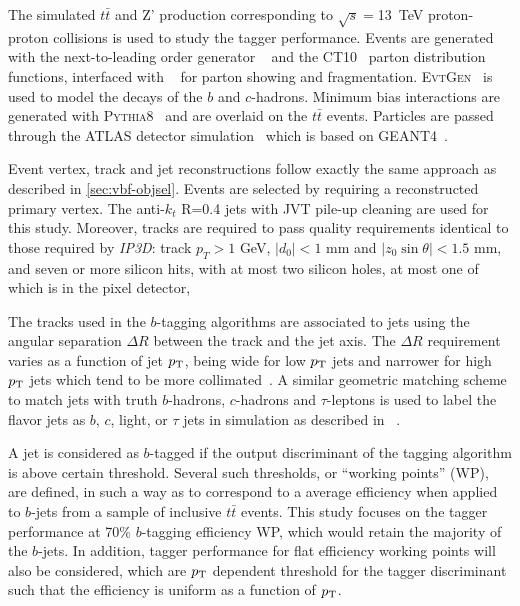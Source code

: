 The simulated $t\bar{t}$ and Z' production corresponding to $\sqrt{s}=$13~TeV proton-proton
collisions is used to study the tagger performance. Events are generated with the
next-to-leading order generator \powheg{}~\cite{bib:powheg} and the \textsc{CT10}~\cite{Lai:2010vv}
parton distribution functions, interfaced with \pythia{}~\cite{pythia2} for parton showing and
fragmentation. \textsc{EvtGen}~\cite{Lange:2001uf} is used to model the decays of
the $b$ and $c$-hadrons. Minimum bias interactions are generated with \textsc{Pythia8}~\cite{Pythia8}
and are overlaid on the $t\bar{t}$ events. Particles are passed through the ATLAS detector
simulation~\cite{atlas_simulation} which is based on \textsc{GEANT4}~\cite{Agostinelli:2002hh}.

Event vertex, track and jet reconstructions follow exactly the same approach as described in \ref{sec:vbf-objsel}. Events are selected by requiring a reconstructed primary vertex. The anti-$k_t$ R=0.4 jets with JVT pile-up cleaning are used for this study. Moreover, tracks are required to pass quality requirements identical to those required by \textit{IP3D}: track $p_{T} > 1$ GeV, $| d_0 | <1$ mm and $| z_0 \sin \theta | <1.5$ mm, and seven or more silicon hits, with at most two silicon holes, at most one of which is in the pixel detector,

The tracks used in the $b$-tagging algorithms are associated to jets
using the angular separation $\Delta R$ between the track and the jet axis.
The $\Delta R$ requirement varies as a function of jet $p_{{\rm T}}$,
being wide for low $p_{{\rm T}}$ jets and narrower for high $p_{{\rm T}}$ jets which tend to be more
collimated~\cite{ref:btagPaper}.
A similar geometric matching scheme to match jets with truth $b$-hadrons, $c$-hadrons and $\tau$-leptons
is used to label the flavor jets as $b$, $c$, light, or $\tau$ jets in simulation as described in ~\cite{ATL-PHYS-PUB-2015-022}.

A jet is considered as $b$-tagged if the output
discriminant of the tagging algorithm
is above certain threshold. Several such thresholds,
or ``working points'' (WP), are defined, in such a way as to correspond to
a average efficiency when applied to $b$-jets from a sample of
inclusive $t\bar{t}$ events. This study focuses on the tagger performance at
70\% $b$-tagging efficiency WP, which would retain the majority of the $b$-jets.
In addition, tagger performance for flat efficiency working points will also be considered,
which are $p_{{\rm T}}$ dependent threshold for the tagger discriminant such that the \btagging efficiency
is uniform as a function of $p_{{\rm T}}$.
